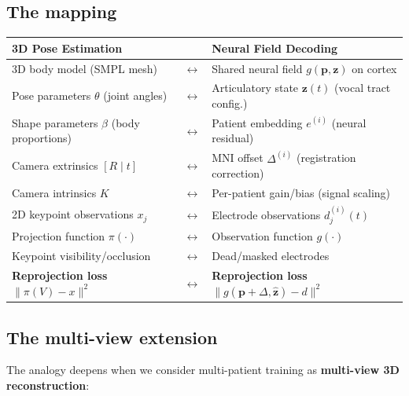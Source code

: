 \documentclass[11pt,letterpaper]{article}
\newcommand{\bfp}{\mathbf{p}}
\newcommand{\bfz}{\mathbf{z}}
\begin{document}
\subsection{The mapping}

\begin{table}[ht]\centering\small
\begin{tabular}{@{}p{}p{}p{}@{}}
\toprule
\textbf{3D Pose Estimation} & & \textbf{Neural Field Decoding} \\
\midrule
3D body model (SMPL mesh) & $\leftrightarrow$ & Shared neural field $g(\bfp, \bfz)$ on cortex \\[3pt]
Pose parameters $\theta$ (joint angles) & $\leftrightarrow$ & Articulatory state $\bfz(t)$ (vocal tract config.) \\[3pt]
Shape parameters $\beta$ (body proportions) & $\leftrightarrow$ & Patient embedding $e^{(i)}$ (neural residual) \\[3pt]
Camera extrinsics $[R \mid t]$ & $\leftrightarrow$ & MNI offset $\Delta^{(i)}$ (registration correction) \\[3pt]
Camera intrinsics $K$ & $\leftrightarrow$ & Per-patient gain/bias (signal scaling) \\[3pt]
2D keypoint observations $x_j$ & $\leftrightarrow$ & Electrode observations $d_j^{(i)}(t)$ \\[3pt]
Projection function $\pi(\cdot)$ & $\leftrightarrow$ & Observation function $g(\cdot)$ \\[3pt]
Keypoint visibility/occlusion & $\leftrightarrow$ & Dead/masked electrodes \\[3pt]
\textbf{Reprojection loss} $\|\pi(V) - x\|^2$ & $\leftrightarrow$ & \textbf{Reprojection loss} $\|g(\bfp{+}\Delta, \hat{\bfz}) - d\|^2$ \\
\bottomrule
\end{tabular}
\end{table}

\subsection{The multi-view extension}

The analogy deepens when we consider multi-patient training as \textbf{multi-view 3D reconstruction}:
\end{document}
